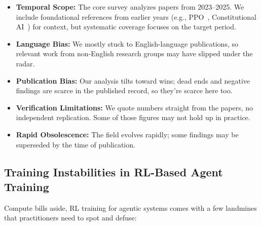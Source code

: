\documentclass[12pt,a4paper]{report}
\theoremstyle{definition}
\begin{document}
\begin{itemize}
    \item \textbf{Temporal Scope:} The core survey analyzes papers from 2023--2025. We include foundational references from earlier years (e.g., PPO~\cite{schulman2017ppo}, Constitutional AI~\cite{bai2022constitutional}) for context, but systematic coverage focuses on the target period.
    \item \textbf{Language Bias:} We mostly stuck to English-language publications, so relevant work from non-English research groups may have slipped under the radar.
    \item \textbf{Publication Bias:} Our analysis tilts toward wins; dead ends and negative findings are scarce in the published record, so they're scarce here too.
    \item \textbf{Verification Limitations:} We quote numbers straight from the papers, no independent replication. Some of those figures may not hold up in practice.
    \item \textbf{Rapid Obsolescence:} The field evolves rapidly; some findings may be superseded by the time of publication.
\end{itemize}

\subsection{Training Instabilities in RL-Based Agent Training}
\label{sec:training_instabilities}

Compute bills aside, RL training for agentic systems comes with a few landmines that practitioners need to spot and defuse:
\end{document}
